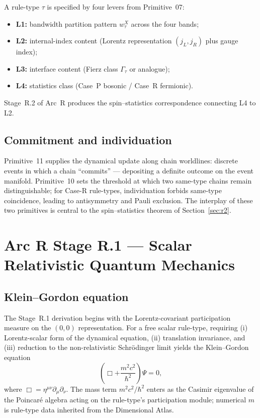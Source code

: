 \documentclass[11pt,a4paper]{article}
\begin{document}
A rule-type $\tau$ is specified by four levers from Primitive~07:
\begin{itemize}
  \item \textbf{L1:} bandwidth partition pattern $w_\tau^X$ across the four bands;
  \item \textbf{L2:} internal-index content (Lorentz representation $(j_L, j_R)$ plus gauge index);
  \item \textbf{L3:} interface content (Fierz class $\Gamma_\tau$ or analogue);
  \item \textbf{L4:} statistics class (Case~P bosonic / Case~R fermionic).
\end{itemize}
Stage~R.2 of Arc~R produces the spin--statistics correspondence connecting L4 to L2.

\subsection{Commitment and individuation}

Primitive~11 supplies the dynamical update along chain worldlines: discrete events in which a chain ``commits'' --- depositing a definite outcome on the event manifold. Primitive~10 sets the threshold at which two same-type chains remain distinguishable; for Case-R rule-types, individuation forbids same-type coincidence, leading to antisymmetry and Pauli exclusion. The interplay of these two primitives is central to the spin--statistics theorem of Section~\ref{sec:r2}.

\section{Arc R Stage R.1 --- Scalar Relativistic Quantum Mechanics}

\subsection{Klein--Gordon equation}

The Stage~R.1 derivation begins with the Lorentz-covariant participation measure on the $(0,0)$ representation. For a free scalar rule-type, requiring (i) Lorentz-scalar form of the dynamical equation, (ii) translation invariance, and (iii) reduction to the non-relativistic Schr\"odinger limit yields the Klein--Gordon equation
\begin{equation}
\left( \Box + \frac{m^2 c^2}{\hbar^2} \right) \Psi = 0,
\label{eq:KG}
\end{equation}
where $\Box = \eta^{\mu\nu} \partial_\mu \partial_\nu$. The mass term $m^2 c^2/\hbar^2$ enters as the Casimir eigenvalue of the Poincar\'e algebra acting on the rule-type's participation module; numerical $m$ is rule-type data inherited from the Dimensional Atlas.
\end{document}
